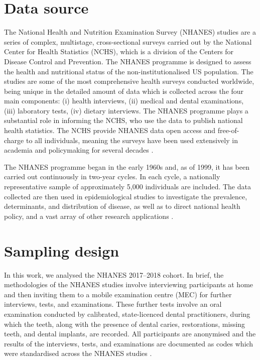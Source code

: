 \section{Data source}

The National Health and Nutrition Examination Survey (NHANES) studies are a series of complex, multistage, cross-sectional surveys carried out by the National Center for Health Statistics (NCHS), which is a division of the Centers for Disease Control and Prevention. The NHANES programme is designed to assess the health and nutritional status of the non-institutionalised US population. The studies are some of the most comprehensive health surveys conducted worldwide, being unique in the detailed amount of data which is collected across the four main components: (i) health interviews, (ii) medical and dental examinations, (iii) laboratory tests, (iv) dietary interviews. The NHANES programme plays a substantial role in informing the NCHS, who use the data to publish national health statistics. The NCHS provide NHANES data open access and free-of-charge to all individuals, meaning the surveys have been used extensively in academia and policymaking for several decades \citep{cdcnhanes}.

The NHANES programme began in the early 1960s and, as of 1999, it has been carried out continuously in two-year cycles. In each cycle, a nationally representative sample of approximately 5,000 individuals are included. The data collected are then used in epidemiological studies to investigate the prevalence, determinants, and distribution of disease, as well as to direct national health policy, and a vast array of other research applications \citep{cdcnhanes}.

\section{Sampling design}

In this work, we analysed the NHANES 2017--2018 cohort. In brief, the methodologies of the NHANES studies involve interviewing participants at home and then inviting them to a mobile examination centre (MEC) for further interviews, tests, and examinations. These further tests involve an oral examination conducted by calibrated, state-licenced dental practitioners, during which the teeth, along with the presence of dental caries, restorations, missing teeth, and dental implants, are recorded. All participants are anonymised and the results of the interviews, tests, and examinations are documented as codes which were standardised across the NHANES studies \citep{bashir2022}.

